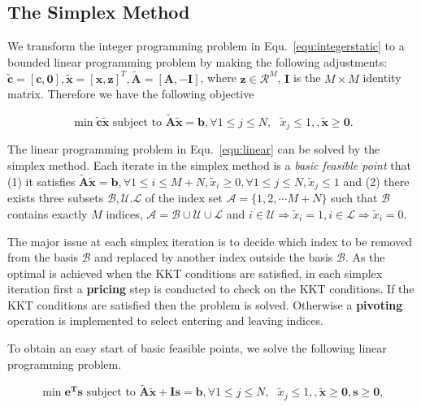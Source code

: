 \documentclass[envcountsame]{llncs}
\begin{document}
\subsection{The Simplex Method}
We transform the integer programming problem in Equ.~\ref{equ:integerstatic} to a bounded linear programming problem by making the following adjustments: $\tilde{\mathbf{c}}=[\mathbf{c},\mathbf{0}],\tilde{\mathbf{x}}=[\mathbf{x},\mathbf{z}]^T,\tilde{\mathbf{A}}=[\mathbf{A},-\mathbf{I}]$, where $\mathbf{z}\in\mathcal{R}^M$, $ \mathbf{I}$ is the $M\times M$ identity matrix. Therefore we have the following objective

\begin{equation}\label{equ:linear}
\min \tilde{\mathbf{c}}\tilde{\mathbf{x}}\textrm{ subject to } \tilde{\mathbf{A}}\tilde{\mathbf{x}} = \mathbf{b}, \forall 1\leq j\leq N,\textrm{ } \tilde{x}_j \leq 1, ,\tilde{\mathbf{x}}\geq \mathbf{0}.
\end{equation}

The linear programming problem in Equ.~\ref{equ:linear} can be solved by the simplex method. Each iterate in the simplex method is a \emph{basic feasible point} that (1) it satisfies $\tilde{\mathbf{A}}\tilde{\mathbf{x}} = \mathbf{b}, \forall 1\leq i\leq M+N,\tilde{x}_i \geq 0,\forall 1\leq j\leq N, \tilde{x}_j \leq 1$ and (2) there exists three subsets $\mathcal{B,U.L}$ of the index set $\mathcal{A}=\{1,2,\cdots M+N\}$ such that $\mathcal{B}$ contains exactly $M$ indices, $\mathcal{A}=\mathcal{B}\cup \mathcal{U} \cup \mathcal{L}$ and $i \in \mathcal{U} \Rightarrow \tilde{x}_i=1,i \in \mathcal{L} \Rightarrow \tilde{x}_i=0$.

The major issue at each simplex iteration is to decide which index to be removed from the basis $\mathcal{B}$ and replaced by another index outside the basis $\mathcal{B}$.  As the optimal is achieved when the KKT conditions are satisfied, in each simplex iteration first  a \textbf{pricing} step is conducted to check on the KKT conditions.  If the KKT conditions are satisfied then the problem is solved. Otherwise a \textbf{pivoting} operation is implemented to select entering and leaving indices.

To obtain an easy start of basic feasible points, we solve the following linear programming problem.

\begin{equation}\label{equ:linearphaseI}
\min \mathbf{e^{T}s} \textrm{ subject to } \tilde{\mathbf{A}}\tilde{\mathbf{x}} + \mathbf{Is} = \mathbf{b},  \forall 1\leq j\leq N,\textrm{ } \tilde{x}_j \leq 1, ,\tilde{\mathbf{x}}\geq \mathbf{0}, \mathbf{s}\geq \mathbf{0},
\end{equation}
\end{document}

